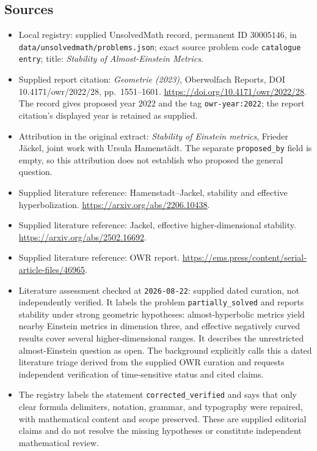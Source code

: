 \documentclass[11pt]{article}
\begin{document}
\subsection{Sources}
\begin{itemize}
\item Local registry: supplied UnsolvedMath record, permanent ID \(30005146\), in \texttt{data/unsolvedmath/problems.json}; exact source problem code \texttt{catalogue entry}; title: \emph{Stability of Almost-Einstein Metrics}.
\item Supplied report citation: \emph{Geometrie (2023)}, Oberwolfach Reports, DOI 10.4171/owr/2022/28, pp.~1551--1601. \url{https://doi.org/10.4171/owr/2022/28}. The record gives proposed year \(2022\) and the tag \texttt{owr-year:2022}; the report citation's displayed year is retained as supplied.
\item Attribution in the original extract: \emph{Stability of Einstein metrics}, Frieder Jäckel, joint work with Ursula Hamenstädt. The separate \texttt{proposed\_by} field is empty, so this attribution does not establish who proposed the general question.
\item Supplied literature reference: Hamenstadt--Jackel, stability and effective hyperbolization. \url{https://arxiv.org/abs/2206.10438}.
\item Supplied literature reference: Jackel, effective higher-dimensional stability. \url{https://arxiv.org/abs/2502.16692}.
\item Supplied literature reference: OWR report. \url{https://ems.press/content/serial-article-files/46965}.
\item Literature assessment checked at \texttt{2026-08-22}: supplied dated curation, not independently verified. It labels the problem \texttt{partially\_solved} and reports stability under strong geometric hypotheses: almost-hyperbolic metrics yield nearby Einstein metrics in dimension three, and effective negatively curved results cover several higher-dimensional ranges. It describes the unrestricted almost-Einstein question as open. The background explicitly calls this a dated literature triage derived from the supplied OWR curation and requests independent verification of time-sensitive status and cited claims.
\item The registry labels the statement \texttt{corrected\_verified} and says that only clear formula delimiters, notation, grammar, and typography were repaired, with mathematical content and scope preserved. These are supplied editorial claims and do not resolve the missing hypotheses or constitute independent mathematical review.
\end{itemize}
\end{document}
